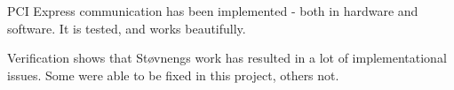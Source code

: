 
PCI Express communication has been implemented - both in hardware and software.
It is tested, and works beautifully.

Verification shows that Støvnengs work has resulted in a lot of implementational issues.
Some were able to be fixed in this project, others not.

